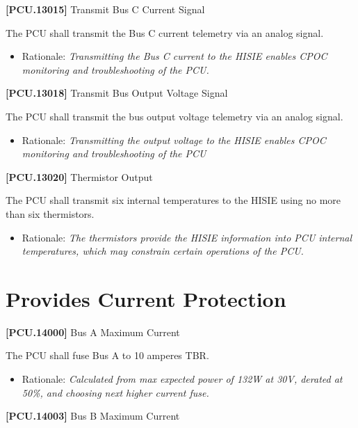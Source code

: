 \documentclass[12pt,oneside,oldfontcommands]{memoir}
\begin{document}
\textbf{[PCU.13015]} Transmit Bus C Current Signal

The \gls{PCU} shall transmit the Bus C current telemetry via an analog signal.

\begin{itemize}
\item{} Rationale: \emph{Transmitting the Bus C current to the HISIE enables CPOC monitoring and troubleshooting of the PCU.}

\end{itemize}

\textbf{[PCU.13018]} Transmit Bus Output Voltage Signal

The \gls{PCU} shall transmit the bus output voltage telemetry via an analog signal.

\begin{itemize}
\item{} Rationale: \emph{Transmitting the output voltage to the HISIE enables CPOC monitoring and troubleshooting of the PCU}

\end{itemize}

\textbf{[PCU.13020]} Thermistor Output

The \gls{PCU} shall transmit six internal temperatures to the \gls{HISIE} using no more than six thermistors.

\begin{itemize}
\item{} Rationale: \emph{The thermistors provide the HISIE information into PCU internal temperatures, which may constrain certain operations of the PCU.}

\end{itemize}

\section{Provides Current Protection}
\label{providescurrentprotection}

\textbf{[PCU.14000]} Bus A Maximum Current

The \gls{PCU} shall fuse Bus A to 10 amperes TBR\label{tbx_5}.

\begin{itemize}
\item{} Rationale: \emph{Calculated from max expected power of 132W at 30V, derated at 50\%, and choosing next higher current fuse.}

\end{itemize}

\textbf{[PCU.14003]} Bus B Maximum Current
\end{document}
